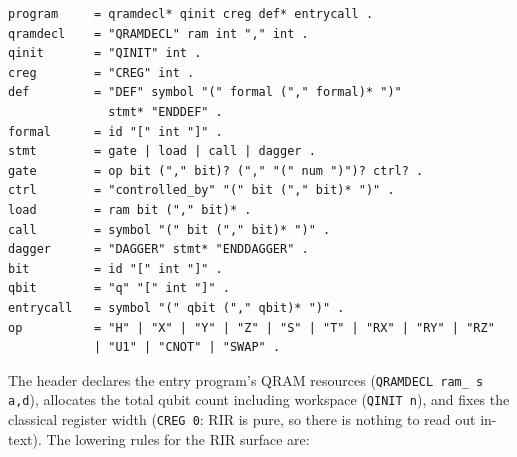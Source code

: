 \begin{lstlisting}[style=pyqir, caption={Grammar of the OriginIR-ext dialect as emitted by \texttt{export\_originir}.  \texttt{id} is \texttt{[A-Za-z\_][A-Za-z0-9\_]*}; \texttt{ram} names a declared QRAM resource; definition names consist of the module name and a content hash, making exports deterministic and diff-stable.}, label={lst:originir-grammar}]
program     = qramdecl* qinit creg def* entrycall .
qramdecl    = "QRAMDECL" ram int "," int .
qinit       = "QINIT" int .
creg        = "CREG" int .
def         = "DEF" symbol "(" formal ("," formal)* ")"
              stmt* "ENDDEF" .
formal      = id "[" int "]" .
stmt        = gate | load | call | dagger .
gate        = op bit ("," bit)? ("," "(" num ")")? ctrl? .
ctrl        = "controlled_by" "(" bit ("," bit)* ")" .
load        = ram bit ("," bit)* .
call        = symbol "(" bit ("," bit)* ")" .
dagger      = "DAGGER" stmt* "ENDDAGGER" .
bit         = id "[" int "]" .
qbit        = "q" "[" int "]" .
entrycall   = symbol "(" qbit ("," qbit)* ")" .
op          = "H" | "X" | "Y" | "Z" | "S" | "T" | "RX" | "RY" | "RZ"
            | "U1" | "CNOT" | "SWAP" .
\end{lstlisting}

The header declares the entry program's QRAM resources
(\texttt{QRAMDECL ram\_\ s a,d}), allocates the total qubit count including
workspace (\texttt{QINIT n}), and fixes the classical register width
(\texttt{CREG 0}: RIR is pure, so there is nothing to read out in-text).
The lowering rules for the RIR surface are:

